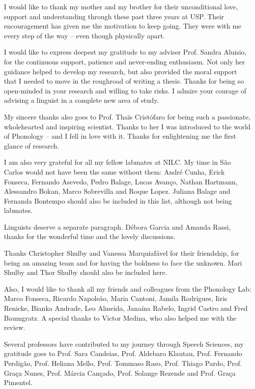 
\begin{acknowledgements}

I would like to thank my mother and my brother for their unconditional love, support and understanding through these past three years at USP. Their encouragement has given me the motivation to keep going. They were with me every step of the way -- even though physically apart.

\bigskip
I would like to express deepest my gratitude to my adviser Prof. Sandra Aluisio, for the continuous support, patience and never-ending enthusiasm. Not only her guidance helped to develop my research, but also provided the moral support that I needed to move in the roughroad of writing a thesis. Thanks for being so open-minded in your research and willing to take risks. I admire your courage of advising a linguist in a complete new area of study.

\bigskip
My sincere thanks also goes to Prof. Tha\"is Crist\'ofaro for being such a passionate, wholehearted and inspiring scientist. Thanks to her I was introduced to the world of Phonology -- and I fell in love with it. Thanks for enlightening me the first glance of research.

\bigskip
I am also very grateful for all my fellow labmates at NILC. My time in S\~ao Carlos would not have been the same without them: Andr\'e Cunha, Erick Fonseca, Fernando Asevedo, Pedro Balage, Lucas Avan\c{c}o, Nathan Hartmann, Alessandro Bokan, Marco Sobrevilla and Roque Lopez. Juliana Balage and Fernanda Bontempo should also be included in this list, although not being labmates.

\bigskip
Linguists deserve a separate paragraph. D\'ebora Garcia and Amanda Rassi, thanks for the wonderful time and the lovely discussions.

\bigskip
Thanks Christopher Shulby and Vanessa Marquiaf\'avel for their friendship, for being an amazing team and for having the boldness to face the unknown. Mari Shulby and Thor Shulby should also be included here.

\bigskip
Also, I would like to thank all my friends and colleagues from the Phonology Lab: Marco Fonseca, Ricardo Napoleão, Maria Cantoni, Jamila Rodrigues, Iiris Renicke, Bianka Andrade, Leo Almeida, Janaína Rabelo, Ingrid Castro and Fred Baumgratz. A special thanks to Victor Medina, who also helped me with the review.

\bigskip
Several professors have contributed to my journey through Speech Sciences, my gratitude goes to Prof. Sara Candeias, Prof. Aldebaro Klautau, Prof. Fernando Perdig\~ao, Prof. Heliana Mello, Prof. Tommaso Raso, Prof. Thiago Pardo, Prof. Gra\c{c}a Nunes, Prof. M\'arcia Can\c{c}ado, Prof. Solange Rezende and Prof. Gra\c{c}a Pimentel.


\end{acknowledgements}

